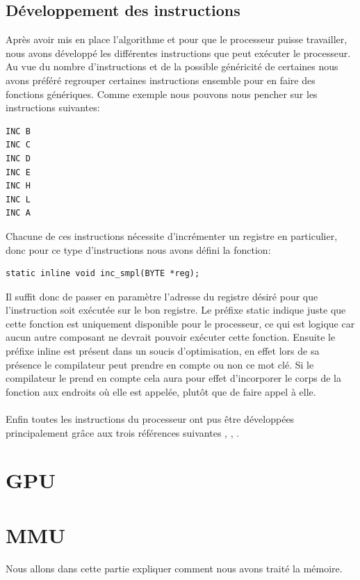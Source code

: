 \documentclass{report}
\begin{document}
\subsection{Développement des instructions}
Après avoir mis en place l'algorithme et pour que le processeur puisse travailler, nous avons développé les différentes instructions que peut exécuter le processeur. Au vue du nombre d'instructions et de la possible généricité de certaines nous avons préféré regrouper certaines instructions ensemble pour en faire des fonctions génériques. Comme exemple nous pouvons nous pencher sur les instructions suivantes:
\begin{lstlisting}
INC B
INC C
INC D
INC E
INC H
INC L
INC A
\end{lstlisting}
Chacune de ces instructions nécessite d'incrémenter un registre en particulier, donc pour ce type d'instructions nous avons défini la fonction:
\begin{lstlisting}
static inline void inc_smpl(BYTE *reg);
\end{lstlisting}
Il suffit donc de passer en paramètre l'adresse du registre désiré pour que l'instruction soit exécutée sur le bon registre.
Le préfixe static indique juste que cette fonction est uniquement disponible pour le processeur, ce qui est logique car aucun autre composant ne devrait pouvoir exécuter cette fonction. Ensuite le préfixe inline est présent dans un soucis d'optimisation, en effet lors de sa présence le compilateur peut prendre en compte ou non ce mot clé. Si le compilateur le prend en compte cela aura pour effet d'incorporer le corps de la fonction aux endroits où elle est appelée, plutôt que de faire appel à elle.\\\\ 
Enfin toutes les instructions du processeur ont pus être développées principalement grâce aux trois références suivantes \cite{pastraiser}, \cite{clrhome}, \cite{pinaud}.
\section{GPU}
\section{MMU}
Nous allons dans cette partie expliquer comment nous avons traité la mémoire. 
\end{document}
